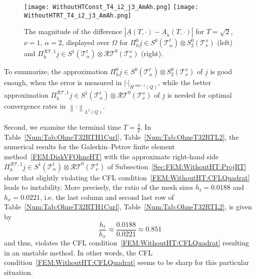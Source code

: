 \documentclass[a4paper,11pt]{article}
\newcommand{\cu}{\operatorname{curl}}
\renewcommand{\vec}[1]{\underline{#1}}
\newcommand{\abs}[1]{\left\lvert{#1}\right\rvert}
\newcommand{\norm}[1]{{\left\lVert{#1}\right\rVert}}
\begin{document}
\begin{figure}[ht]
	\begin{center}
		\texttt{[image: WithoutHTConst\_T4\_i2\_j3\_AmAh.png]}\hspace*{.2cm}
		\texttt{[image: WithoutHTRT\_T4\_i2\_j3\_AmAh.png]}
		\caption{The magnitude of the difference $\abs{\vec A(T,\cdot)- \vec A_h(T,\cdot)}$ for $T=\sqrt{2}$, $\nu = 1$, $\alpha=2$, displayed over $\Omega$ for $\Pi_h^0 \vec j \in S^0(\mathcal T^t_\alpha) \otimes S_2^0(\mathcal T^x_\nu)$ (left) and $\Pi_h^{\mathcal{RT},1} \vec j \in S^1(\mathcal T^t_\alpha) \otimes \mathcal{RT}^0(\mathcal T^x_\nu)$ (right).}
		\label{Num:Fig:SpuriousModes}
	\end{center}
\end{figure}

To summarize, the approximation $\Pi_h^0 \vec j \in S^0(\mathcal T^t_\alpha) \otimes S_2^0(\mathcal T^x_\nu)$ of $\vec j$ is good enough, when the error is measured in $\abs{\cdot}_{H^{\cu;1}(Q)}$, while the better approximation $\Pi_h^{\mathcal{RT},1} \vec j  \in S^1(\mathcal T^t_\alpha) \otimes \mathcal{RT}^0(\mathcal T^x_\nu)$ of $\vec j$ is needed for optimal convergence rates in $\norm{\cdot}_{L^2(Q)}.$ 

Second, we examine the terminal time $T=\frac 3 2$. In Table~\ref{Num:Tab:OhneT32RTH1Curl}, Table~\ref{Num:Tab:OhneT32RTL2}, the numerical results for the Galerkin--Petrov finite element method~\eqref{FEM:DiskVFOhneHT} with the approximate right-hand side $\Pi_h^{\mathcal{RT},1} \vec j  \in S^1(\mathcal T^t_\alpha) \otimes \mathcal{RT}^0(\mathcal T^x_\nu)$ of Subsection~\ref{Sec:FEM:WithoutHT:ProjRT} show that slightly violating the CFL condition~\eqref{FEM:WithoutHT:CFLQuadrat} leads to instability. More precisely, the ratio of the mesh sizes $h_t=0.0188$ and $h_x=0.0221$, i.e. the last column and second last row of Table~\ref{Num:Tab:OhneT32RTH1Curl}, Table~\ref{Num:Tab:OhneT32RTL2}, is given by
\begin{equation*}
	\frac{h_t}{h_x} \approx \frac{0.0188}{0.0221} \approx 0.851
\end{equation*}
and thus, violates the CFL condition~\eqref{FEM:WithoutHT:CFLQuadrat} resulting in an unstable method. In other words, the CFL condition~\eqref{FEM:WithoutHT:CFLQuadrat} seems to be sharp for this particular situation.
\end{document}

